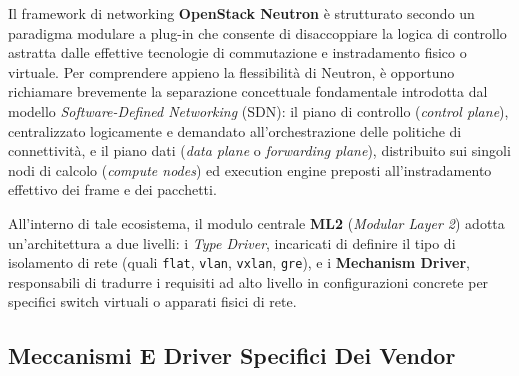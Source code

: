 \documentclass[11pt, a4paper]{article}
\begin{document}
Il framework di networking \textbf{OpenStack Neutron} è strutturato secondo un paradigma modulare a plug-in che consente di disaccoppiare la logica di controllo astratta dalle effettive tecnologie di commutazione e instradamento fisico o virtuale. Per comprendere appieno la flessibilità di Neutron, è opportuno richiamare brevemente la separazione concettuale fondamentale introdotta dal modello \emph{Software-Defined Networking} (SDN): il piano di controllo (\emph{control plane}), centralizzato logicamente e demandato all'orchestrazione delle politiche di connettività, e il piano dati (\emph{data plane} o \emph{forwarding plane}), distribuito sui singoli nodi di calcolo (\emph{compute nodes}) ed execution engine preposti all'instradamento effettivo dei frame e dei pacchetti.

All'interno di tale ecosistema, il modulo centrale \textbf{ML2} (\emph{Modular Layer 2}) adotta un'architettura a due livelli: i \emph{Type Driver}, incaricati di definire il tipo di isolamento di rete (quali \texttt{flat}, \texttt{vlan}, \texttt{vxlan}, \texttt{gre}), e i \textbf{Mechanism Driver}, responsabili di tradurre i requisiti ad alto livello in configurazioni concrete per specifici switch virtuali o apparati fisici di rete.

\subsection{Meccanismi E Driver Specifici Dei Vendor}
\end{document}
